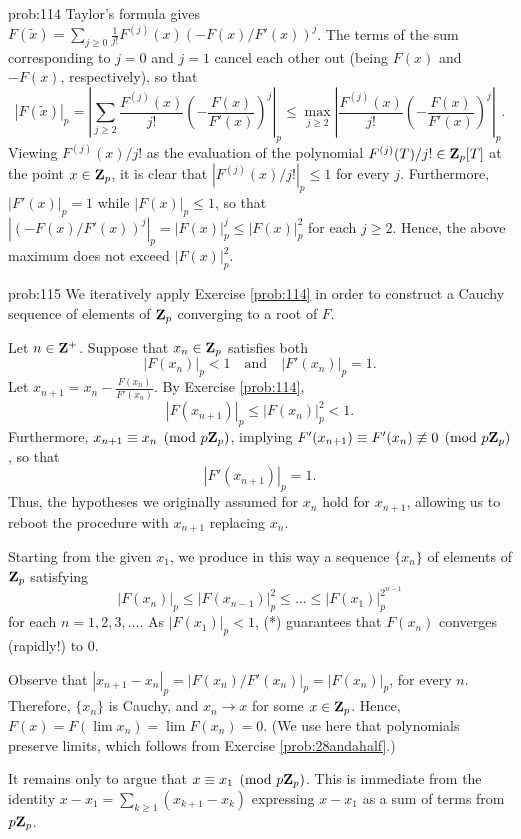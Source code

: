\begin{sol}{prob:114} Taylor's formula gives $F(\tilde{x}) = \sum_{j \ge 0} \frac{1}{j!} F^{(j)}(x) (-F(x)/F'(x))^j$. The terms of the sum corresponding to $j=0$ and $j=1$ cancel each other out (being $F(x)$ and $-F(x)$, respectively), so that
\[ |F(\tilde{x})|_p = \left|\sum_{j\ge 2} \frac{F^{(j)}(x)}{j!} \left(-\frac{F(x)}{F'(x)}\right)^j\right|_p\le \max_{j\ge 2} \left|\frac{F^{(j)}(x)}{j!} \left(-\frac{F(x)}{F'(x)}\right)^j\right|_p.\]
Viewing $F^{(j)}(x)/j!$ as the evaluation of the polynomial $F^{(j)}(T)/j! \in \mathbf{Z}_p[T]$ at the point $x \in \mathbf{Z}_p$, it is clear that $|F^{(j)}(x)/j!|_p \le 1$ for every $j$. Furthermore, $|F'(x)|_p=1$ while $|F(x)|_p \le 1$, so that $|(-F(x)/F'(x))^j|_p = |F(x)|_p^{j} \le |F(x)|_p^2$ for each $j\ge 2$. Hence, the above maximum does not exceed $|F(x)|_p^2$. 
\end{sol}

\begin{sol}{prob:115} We iteratively apply Exercise \ref{prob:114} in order to construct a Cauchy sequence of elements of $\mathbf{Z}_p$ converging to a root of $F$. 

Let $n \in \mathbf{Z}^{+}$. Suppose that $x_n \in \mathbf{Z}_p$ satisfies both \[ |F(x_n)|_p < 1 \quad\text{and}\quad |F'(x_n)|_p=1.\] Let $x_{n+1} = x_n - \frac{F(x_n)}{F'(x_n)}$. By Exercise \ref{prob:114},
\[ |F(x_{n+1})|_p \le |F(x_n)|_p^2 < 1.\] Furthermore, $x_{n+1}\equiv x_n\pmod{p\mathbf{Z}_p}$, implying $F'(x_{n+1})\equiv F'(x_n)\not\equiv 0\pmod{p\mathbf{Z}_p}$, so that \[ |F'(x_{n+1})|_p=1.\] Thus, the hypotheses we originally assumed for $x_n$ hold for $x_{n+1}$, allowing us to reboot the procedure with $x_{n+1}$ replacing $x_{n}$.

Starting from the given $x_1$, we produce in this way a sequence $\{x_n\}$ of elements of $\mathbf{Z}_p$ satisfying
\begin{equation}\tag{*} |F(x_n)|_p \le |F(x_{n-1})|_{p}^2 \le \dots \le |F(x_1)|_p^{2^{n-1}} \end{equation}
for each $n=1,2,3,\dots$. As $|F(x_1)|_p < 1$, (*) guarantees that $F(x_n)$ converges (rapidly!) to $0$.

Observe that $|x_{n+1} - x_{n}|_p = |F(x_n)/F'(x_n)|_p = |F(x_n)|_p$, for every $n$. Therefore, $\{x_n\}$ is Cauchy, and $x_n\to x$ for some $x \in \mathbf{Z}_p$. Hence, $F(x) = F(\lim x_n) = \lim F(x_n) = 0$. (We use here that polynomials preserve limits, which follows from Exercise \ref{prob:28andahalf}.)

It remains only to argue that $x \equiv x_1\pmod{p\mathbf{Z}_p}$. This is immediate from the identity $x - x_1 = \sum_{k \ge 1} (x_{k+1}-x_k)$ expressing $x-x_1$ as a sum of terms from $p\mathbf{Z}_p$.
\end{sol}

